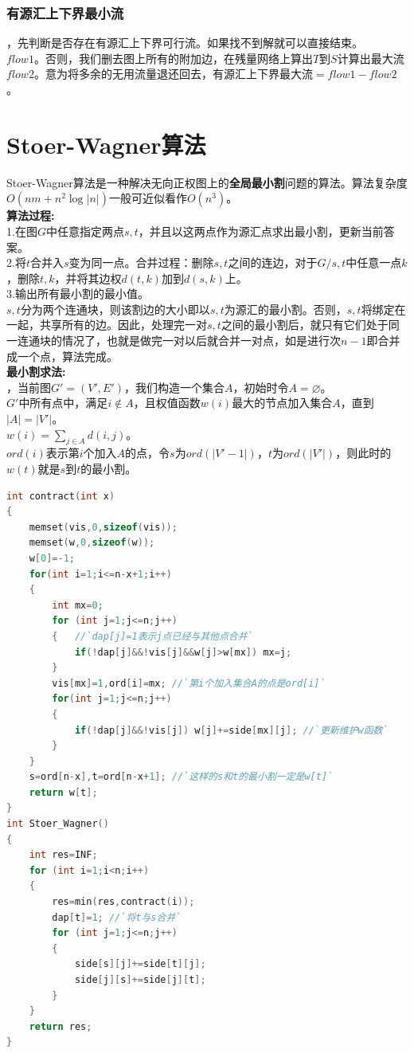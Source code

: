 \documentclass[a4paper]{book}
\begin{document}
\subsubsection{有源汇上下界最小流}
，先判断是否存在有源汇上下界可行流。如果找不到解就可以直接结束。\\
$flow1$。否则，我们删去图上所有的附加边，在残量网络上算出$T$到$S$计算出最大流$flow2$。意为将多余的无用流量退还回去，有源汇上下界最大流$=flow1-flow2$。
\section{Stoer-Wagner算法}
\indent Stoer-Wagner算法是一种解决无向正权图上的\textbf{全局最小割}问题的算法。算法复杂度$O(nm+n^2\log|n|)$一般可近似看作$O(n^3)$。\\
\noindent\textbf{算法过程:}\\
\indent1.在图$G$中任意指定两点$s,t$，并且以这两点作为源汇点求出最小割，更新当前答案。\\
\indent2.将$t$合并入$s$变为同一点。合并过程：删除$s,t$之间的连边，对于$G/{s,t}$中任意一点$k$，删除$t,k$，并将其边权$d(t,k)$加到$d(s,k)$上。\\
\indent3.输出所有最小割的最小值。\\
$s,t$分为两个连通块，则该割边的大小即以$s,t$为源汇的最小割。否则，$s,t$将绑定在一起，共享所有的边。因此，处理完一对$s,t$之间的最小割后，就只有它们处于同一连通块的情况了，也就是做完一对以后就合并一对点，如是进行次$n-1$即合并成一个点，算法完成。\\
\noindent\textbf{最小割求法:}\\
，当前图$G'=(V',E')$，我们构造一个集合$A$，初始时令$A=\varnothing$。\\
$G'$中所有点中，满足$i\notin A$，且权值函数$w(i)$最大的节点加入集合$A$，直到$|A|=|V'|$。\\
$w(i)=\displaystyle\sum_{j\in A}d(i,j)$。\\
$ord(i)$表示第$i$个加入$A$的点，令$s$为$ord(|V'-1|)$，$t$为$ord(|V'|)$，则此时的$w(t)$就是$s$到$t$的最小割。
\begin{lstlisting}[language=c++,escapeinside=``]
int contract(int x) 
{
    memset(vis,0,sizeof(vis));
    memset(w,0,sizeof(w));
    w[0]=-1;
    for(int i=1;i<=n-x+1;i++) 
    {
        int mx=0;
        for (int j=1;j<=n;j++) 
        {   //`dap[j]=1表示j点已经与其他点合并`
            if(!dap[j]&&!vis[j]&&w[j]>w[mx]) mx=j;
        }
        vis[mx]=1,ord[i]=mx; //`第i个加入集合A的点是ord[i]`
        for(int j=1;j<=n;j++) 
        {
            if(!dap[j]&&!vis[j]) w[j]+=side[mx][j]; //`更新维护w函数`
        }
    }
    s=ord[n-x],t=ord[n-x+1]; //`这样的s和t的最小割一定是w[t]`
    return w[t];
}
int Stoer_Wagner() 
{
    int res=INF;
    for (int i=1;i<n;i++) 
    {
        res=min(res,contract(i));
        dap[t]=1; //`将t与s合并`
        for (int j=1;j<=n;j++) 
        {
            side[s][j]+=side[t][j];
            side[j][s]+=side[j][t];
        }
    }
    return res;
}
\end{lstlisting}
\end{document}
